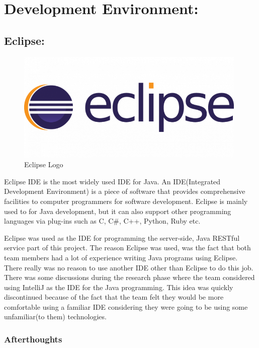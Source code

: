 \section{Development Environment:}
\bigskip


\subsection{Eclipse:}
\label{sec:TechnologyReviewEclipse}
\begin{figure}[H]
    \centering
    \includegraphics[width=\textwidth, height=150pt]{img/eclipseLogo.png}
    \caption{Eclipse Logo}
    \label{fig:my_label}
\end{figure}

\bigskip

Eclipse IDE is the most widely used IDE for Java. An IDE(Integrated Development Environment) is a piece of software that provides  comprehensive facilities to computer programmers for software development. Eclipse is mainly used to for Java development, but it can also support other programming languages via plug-ins such as C, C\#, C++, Python, Ruby etc. 

\bigskip

Eclipse was used as the IDE for programming the server-side, Java RESTful service part of this project. The reason Eclipse was used, was the fact that both team members had a lot of experience writing Java programs using Eclipse. There really was no reason to use another IDE other than Eclipse to do this job. There was some discussions during the research phase where the team considered using IntelliJ as the IDE for the Java programming. This idea was quickly discontinued because of the fact that the team felt they would be more comfortable using a familiar IDE considering they were going to be using some unfamiliar(to them) technologies.

\subsubsection{Afterthoughts}

